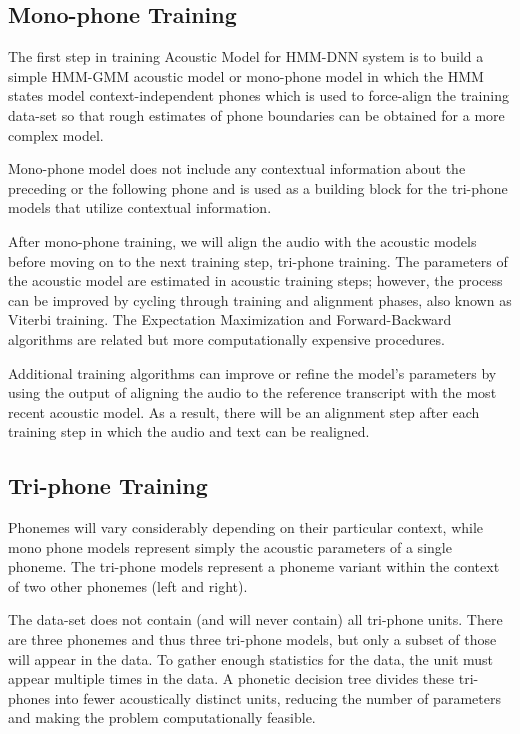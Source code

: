 \subsection{Mono-phone Training}
\label{sub:mono-phone}
The first step in training Acoustic Model for HMM-DNN system is to build a simple HMM-GMM acoustic model or mono-phone model in which the HMM states model context-independent phones which is used to force-align the training data-set so that rough estimates of phone boundaries can be obtained for a more complex model. %

Mono-phone model does not include any contextual information about the preceding or the following phone and is used as a building block for the tri-phone models that utilize contextual information. %

After mono-phone training, we will align the audio with the acoustic models before moving on to the next training step, tri-phone training. The parameters of the acoustic model are estimated in acoustic training steps; however, the process can be improved by cycling through training and alignment phases, also known as Viterbi training. The Expectation Maximization and Forward-Backward algorithms are related but more computationally expensive procedures.

Additional training algorithms can improve or refine the model's parameters by using the output of aligning the audio to the reference transcript with the most recent acoustic model. As a result, there will be an alignment step after each training step in which the audio and text can be realigned. 

\subsection{Tri-phone Training}
\label{sub:tri-phone}
Phonemes will vary considerably depending on their particular context, while mono phone models represent simply the acoustic parameters of a single phoneme. The tri-phone models represent a phoneme variant within the context of two other phonemes (left and right). %

The data-set does not contain (and will never contain) all tri-phone units. There are three phonemes and thus three tri-phone models, but only a subset of those will appear in the data. To gather enough statistics for the data, the unit must appear multiple times in the data. A phonetic decision tree divides these tri-phones into fewer acoustically distinct units, reducing the number of parameters and making the problem computationally feasible.

